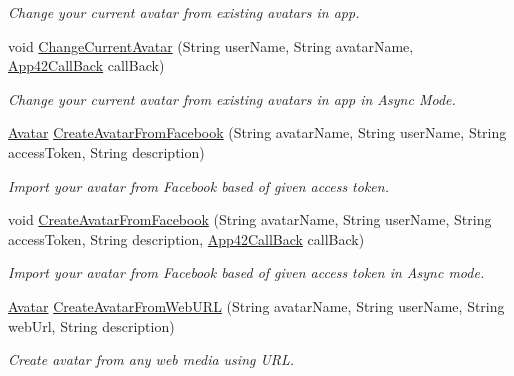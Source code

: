 \begin{DoxyCompactItemize}
\begin{DoxyCompactList}\small\item\em Change your current avatar from existing avatars in app. \end{DoxyCompactList}\item 
void \hyperlink{classcom_1_1shephertz_1_1app42_1_1paas_1_1sdk_1_1csharp_1_1avatar_1_1_avatar_service_ae85cfae1c508eead9a17cc459cd271a9}{Change\+Current\+Avatar} (String user\+Name, String avatar\+Name, \hyperlink{interfacecom_1_1shephertz_1_1app42_1_1paas_1_1sdk_1_1csharp_1_1_app42_call_back}{App42\+Call\+Back} call\+Back)
\begin{DoxyCompactList}\small\item\em Change your current avatar from existing avatars in app in Async Mode. \end{DoxyCompactList}\item 
\hyperlink{classcom_1_1shephertz_1_1app42_1_1paas_1_1sdk_1_1csharp_1_1avatar_1_1_avatar}{Avatar} \hyperlink{classcom_1_1shephertz_1_1app42_1_1paas_1_1sdk_1_1csharp_1_1avatar_1_1_avatar_service_ac03e5b6f2024010a8b6a1dceb283c28c}{Create\+Avatar\+From\+Facebook} (String avatar\+Name, String user\+Name, String access\+Token, String description)
\begin{DoxyCompactList}\small\item\em Import your avatar from Facebook based of given access token. \end{DoxyCompactList}\item 
void \hyperlink{classcom_1_1shephertz_1_1app42_1_1paas_1_1sdk_1_1csharp_1_1avatar_1_1_avatar_service_aa458a6c81f7395dac620a0c7c123ca3d}{Create\+Avatar\+From\+Facebook} (String avatar\+Name, String user\+Name, String access\+Token, String description, \hyperlink{interfacecom_1_1shephertz_1_1app42_1_1paas_1_1sdk_1_1csharp_1_1_app42_call_back}{App42\+Call\+Back} call\+Back)
\begin{DoxyCompactList}\small\item\em Import your avatar from Facebook based of given access token in Async mode. \end{DoxyCompactList}\item 
\hyperlink{classcom_1_1shephertz_1_1app42_1_1paas_1_1sdk_1_1csharp_1_1avatar_1_1_avatar}{Avatar} \hyperlink{classcom_1_1shephertz_1_1app42_1_1paas_1_1sdk_1_1csharp_1_1avatar_1_1_avatar_service_a3b6e8129db47a2053fc96c1647ddf025}{Create\+Avatar\+From\+Web\+U\+R\+L} (String avatar\+Name, String user\+Name, String web\+Url, String description)
\begin{DoxyCompactList}\small\item\em Create avatar from any web media using U\+R\+L. \end{DoxyCompactList}\item 

\end{DoxyCompactItemize}
